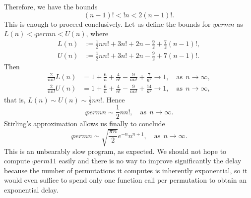 Therefore, we have the bounds
\[
(n-1)! < {!}n < 2 (n-1)!.
\]
This is enough to proceed conclusively. Let us define the bounds for
\(\comp{perm}{n}\) as \(L(n) < \comp{perm}{n} < U(n)\), where
\begin{align*}
L(n) &:= \frac{1}{2}{nn!} + 3n! + 2n - \frac{9}{2}
                 + \frac{7}{2}{(n-1)!},\\
U(n) &:= \frac{1}{2}{nn!} + 3n! + 2n - \frac{9}{2}
                 + 7(n-1)!.
\end{align*}
Then
\begin{align*}
\frac{2}{nn!}{L(n)}
     &= 1 + \frac{6}{n} + \frac{4}{n!} - \frac{9}{nn!}
        + \frac{7}{n^2}
     \rightarrow 1,\quad \text{as} \,\; n \rightarrow \infty,\\
\frac{2}{nn!}{U(n)}
     &= 1 + \frac{6}{n} + \frac{4}{n!} - \frac{9}{nn!}
        + \frac{14}{n^2}
     \rightarrow 1,\quad \text{as} \,\; n \rightarrow \infty,
\end{align*}
that is, \(L(n) \mathrel{\sim} U(n) \mathrel{\sim}
\frac{1}{2}{nn!}\). Hence
\[
\comp{perm}{n} \mathrel{\sim} \frac{1}{2}{nn!},\quad \text{as} \,\; n
\rightarrow \infty.
\]
Stirling's approximation allows us finally to conclude
\[
\comp{perm}{n} \mathrel{\sim} \sqrt{\frac{\pi n}{2}} e^{-n}
n^{n+1},\quad \text{as} \,\; n \rightarrow \infty.
\]
This is an unbearably slow program, as expected. We should not hope to
compute \(\comp{perm}{11}\) easily and there is no way to improve
significantly the delay because the number of permutations it computes
is inherently exponential, so it would even suffice to spend only one
function call per permutation to obtain an exponential delay.

